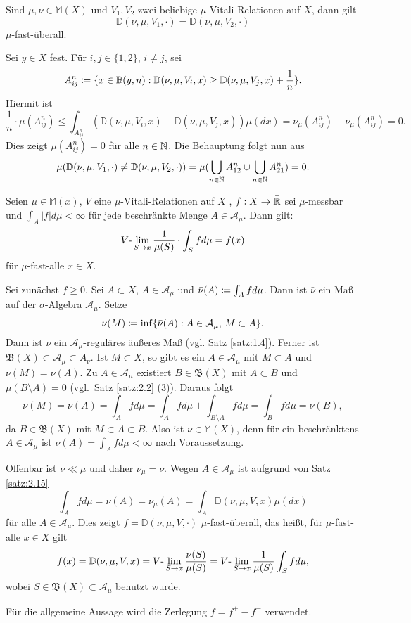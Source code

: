 \documentclass[a4paper,twoside,DIV15,BCOR12mm]{scrbook}
\newcommand{\A}{\mathcal A}
\newcommand{\borel}{\mathfrak B}
\begin{document}
\begin{satz}
\label{satz:2.16}
Sind $\mu,\nu\in\mathbb M(X)$ und $V_1,V_2$ zwei beliebige $\mu$-Vitali-Relationen auf $X$, dann gilt
\[
\mathbb D(\nu,\mu,V_1,\cdot) = \mathbb D(\nu,\mu,V_2,\cdot)
\]
$\mu$-fast-überall.
\end{satz}

\begin{beweis}
Sei $y\in X$ fest. Für $i,j\in\{1,2\}$, $i\ne j$, sei
\[
A_{ij}^n \da \{x\in \mathbb B(y,n): \mathbb D(\nu,\mu,V_i,x) \ge \mathbb D(\nu,\mu,V_j,x) + \frac1n\}.
\]
Hiermit ist
\[
\frac 1n\cdot \mu(A_{ij}^n) \le \int_{A_{ij}^n}(\mathbb D(\nu,\mu,V_i,x) - \mathbb D(\nu,\mu,V_j,x)) \mu(dx) = \nu_\mu(A_{ij}^n) - \nu_\mu(A_{ij}^n) = 0.
\]
Dies zeigt $\mu(A_{ij}^n)=0$ für alle $n\in\mathbb{N}$. Die Behauptung folgt nun aus 
\[
\mu(\mathbb D(\nu,\mu,V_1,\cdot) \ne \mathbb D(\nu,\mu,V_2,\cdot)) =  \mu(\bigcup_{n\in\mathbb{N}} A_{12}^n \cup \bigcup_{n\in\mathbb{N}} A_{21}^n) = 0.
\]
\end{beweis}

\begin{satz}
\label{satz:2.17}
Seien $\mu\in\mathbb M(x)$, $V$ eine $\mu$-Vitali-Relationen auf $X$ , $f:X\to\bar{\mathbb{R}}$ sei $\mu$-messbar und $\int_A |f|d\mu <\infty$ für jede beschränkte Menge $A\in\A_\mu$. Dann gilt:
\[
V\text-\lim_{S\to x} \frac1{\mu(S)} \cdot \int_S fd\mu = f(x)
\]
für $\mu$-fast-alle $x\in X$.
\end{satz}

\begin{beweis}
Sei zunächst $f\ge 0$. Sei $A\subset X$, $A\in \mathcal{A}_\mu$ und $\bar\nu(A) \da \int_A fd\mu$. Dann ist $\bar\nu$ ein Maß auf der $\sigma$-Algebra $\mathcal{A}_\mu$. Setze
\[
\nu(M) \da \inf\{\bar\nu(A):  A\in \A_\mu,\, M\subset A \}.
\]
Dann ist $\nu$ ein $\A_\mu$-reguläres äußeres Maß (vgl. Satz \ref{satz:1.4}). Ferner ist $\borel(X) \subset \A_\mu \subset A_\nu$. Ist $M\subset X$, so gibt es ein $A\in \A_\mu$ mit $M\subset A$ und $\nu(M)=\nu(A)$. Zu $A\in \A_\mu$ existiert $B\in\borel(X)$ mit $A\subset B$ und $\mu(B\setminus A)=0$ (vgl.\ Satz \ref{satz:2.2} (3)). Daraus folgt
\[
\nu(M) = \nu(A) = \int_Afd\mu = \int_A fd\mu + \int_{B\setminus A} fd\mu = \int_B fd\mu = \nu(B),
\]
da $B\in\borel(X)$ mit $M\subset A \subset B$. Also ist $\nu\in\mathbb M(X)$, denn für ein beschränktens $A\in\A_\mu$ ist $\nu(A) = \int_A fd\mu < \infty$ nach Voraussetzung.

Offenbar ist $\nu \ll \mu$ und daher $\nu_\mu = \nu$. Wegen $A\in\A_\mu$ ist aufgrund von Satz \ref{satz:2.15}
\[
\int_A fd\mu = \nu(A) = \nu_\mu(A) = \int_A \mathbb D(\nu,\mu,V,x)\mu(dx)
\]
für alle $A\in\A_\mu$. Dies zeigt $f = \mathbb D(\nu,\mu,V,\cdot)$ $\mu$-fast-überall, das heißt, für $\mu$-fast-alle $x\in X$ gilt
\[
f(x) = \mathbb D(\nu,\mu,V,x) = V\text-\lim_{S\to x} \frac{\nu(S)}{\mu(S)} =  V\text-\lim_{S\to x} \frac1{\mu(S)} \int_S fd\mu,
\]
wobei $S\in\borel(X)\subset\mathcal{A}_\mu$ benutzt wurde.

Für die allgemeine Aussage wird die Zerlegung $f=f^+-f^-$ verwendet.
\end{beweis}
\end{document}
